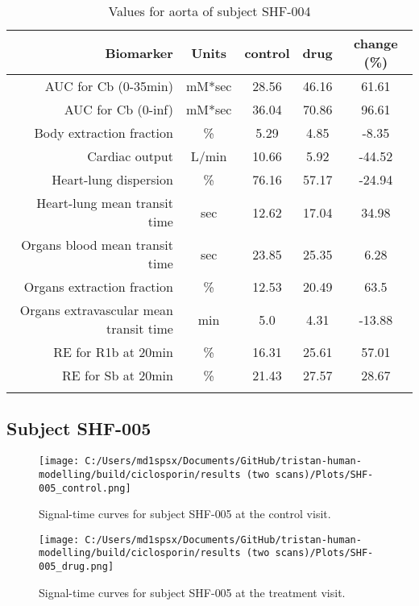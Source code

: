 \documentclass{epflreport}%
\begin{document}
\begin{longtable}{rcccc}%
\hline%
Biomarker&Units&control&drug&change (\%)\\%
\hline%
AUC for Cb (0{-}35min)&mM*sec&28.56&46.16&61.61\\%
AUC for Cb (0{-}inf)&mM*sec&36.04&70.86&96.61\\%
Body extraction fraction&\%&5.29&4.85&{-}8.35\\%
Cardiac output&L/min&10.66&5.92&{-}44.52\\%
Heart{-}lung dispersion&\%&76.16&57.17&{-}24.94\\%
Heart{-}lung mean transit time&sec&12.62&17.04&34.98\\%
Organs blood mean transit time&sec&23.85&25.35&6.28\\%
Organs extraction fraction&\%&12.53&20.49&63.5\\%
Organs extravascular mean transit time&min&5.0&4.31&{-}13.88\\%
RE for R1b at 20min&\%&16.31&25.61&57.01\\%
RE for Sb at 20min&\%&21.43&27.57&28.67\\%
\hline%
\caption{Values for aorta of subject SHF-004} \\%
\end{longtable}%
\clearpage%
\subsection{Subject SHF{-}005}%
\label{subsec:SubjectSHF{-}005}%

%


\begin{figure}[h!]%
\centering%
\texttt{[image: C:/Users/md1spsx/Documents/GitHub/tristan-human-modelling/build/ciclosporin/results (two scans)/Plots/SHF-005\_control.png]}%
\caption{Signal{-}time curves for subject SHF{-}005 at the control visit.}%
\end{figure}

%


\begin{figure}[h!]%
\centering%
\texttt{[image: C:/Users/md1spsx/Documents/GitHub/tristan-human-modelling/build/ciclosporin/results (two scans)/Plots/SHF-005\_drug.png]}%
\caption{Signal{-}time curves for subject SHF{-}005 at the treatment visit.}%
\end{figure}
\end{document}
